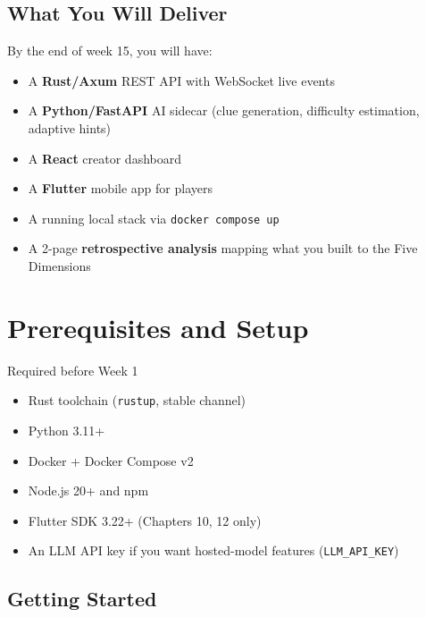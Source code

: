 \documentclass[
  11pt,
  oneside,
  DIV=12,
]{scrartcl}
\begin{document}
\bigskip

\subsection*{What You Will Deliver}

By the end of week 15, you will have:

\begin{itemize}
  \item A \textbf{Rust/Axum} REST API with WebSocket live events
  \item A \textbf{Python/FastAPI} AI sidecar (clue generation, difficulty
        estimation, adaptive hints)
  \item A \textbf{React} creator dashboard
  \item A \textbf{Flutter} mobile app for players
  \item A running local stack via
        \texttt{docker compose up}
  \item A 2-page \textbf{retrospective analysis} mapping what you built
        to the Five Dimensions
\end{itemize}

\clearpage

\section*{Prerequisites and Setup}

\begin{infobox}{Required before Week 1}
\begin{itemize}
  \item Rust toolchain (\texttt{rustup}, stable channel)
  \item Python 3.11+
  \item Docker + Docker Compose v2
  \item Node.js 20+ and npm
  \item Flutter SDK 3.22+ (Chapters 10, 12 only)
  \item An LLM API key if you want hosted-model features (\texttt{LLM\_API\_KEY})
\end{itemize}
\end{infobox}

\subsection*{Getting Started}
\end{document}
